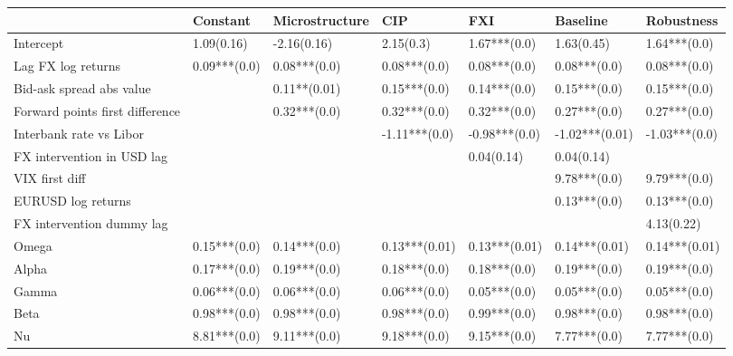 \begin{tabular}{lllllll}
\toprule
{} &      Constant & Microstructure &            CIP &            FXI &        Baseline &     Robustness \\
\midrule
Intercept                       &    1.09(0.16) &    -2.16(0.16) &      2.15(0.3) &   1.67***(0.0) &      1.63(0.45) &   1.64***(0.0) \\
Lag FX log returns              &  0.09***(0.0) &   0.08***(0.0) &   0.08***(0.0) &   0.08***(0.0) &    0.08***(0.0) &   0.08***(0.0) \\
Bid-ask spread abs value        &               &   0.11**(0.01) &   0.15***(0.0) &   0.14***(0.0) &    0.15***(0.0) &   0.15***(0.0) \\
Forward points first difference &               &   0.32***(0.0) &   0.32***(0.0) &   0.32***(0.0) &    0.27***(0.0) &   0.27***(0.0) \\
Interbank rate vs Libor         &               &                &  -1.11***(0.0) &  -0.98***(0.0) &  -1.02***(0.01) &  -1.03***(0.0) \\
FX intervention in USD lag      &               &                &                &     0.04(0.14) &      0.04(0.14) &                \\
VIX first diff                  &               &                &                &                &    9.78***(0.0) &   9.79***(0.0) \\
EURUSD log returns              &               &                &                &                &    0.13***(0.0) &   0.13***(0.0) \\
FX intervention dummy lag       &               &                &                &                &                 &     4.13(0.22) \\
Omega                           &  0.15***(0.0) &   0.14***(0.0) &  0.13***(0.01) &  0.13***(0.01) &   0.14***(0.01) &  0.14***(0.01) \\
Alpha                           &  0.17***(0.0) &   0.19***(0.0) &   0.18***(0.0) &   0.18***(0.0) &    0.19***(0.0) &   0.19***(0.0) \\
Gamma                           &  0.06***(0.0) &   0.06***(0.0) &   0.06***(0.0) &   0.05***(0.0) &    0.05***(0.0) &   0.05***(0.0) \\
Beta                            &  0.98***(0.0) &   0.98***(0.0) &   0.98***(0.0) &   0.99***(0.0) &    0.98***(0.0) &   0.98***(0.0) \\
Nu                              &  8.81***(0.0) &   9.11***(0.0) &   9.18***(0.0) &   9.15***(0.0) &    7.77***(0.0) &   7.77***(0.0) \\

\end{tabular}
